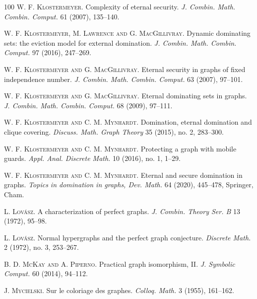 \documentclass[11pt]{article}
\begin{document}
\begin{thebibliography}{100}
	 \textsc{W. F. Klostermeyer}. Complexity of eternal security. \textit{J. Combin. Math. Combin. Comput.} 61 (2007), 135–140. 	
 	
 	 \textsc{W. F. Klostermeyer, M. Lawrence and G. MacGillivray}. Dynamic dominating sets: the eviction model for external domination. \textit{J. Combin. Math. Combin. Comput.} 97 (2016), 247–269. 
 	
 	 \textsc{W. F. Klostermeyer and G. MacGillivray}. Eternal security in graphs of fixed independence number. \textit{J. Combin. Math. Combin. Comput.} 63 (2007), 97–101. 
 	
 	 \textsc{W. F. Klostermeyer and G. MacGillivray}. Eternal dominating sets in graphs. \textit{J. Combin. Math. Combin. Comput.} 68 (2009), 97–111. 
 	
 	 \textsc{W. F. Klostermeyer and C. M. Mynhardt}. Domination, eternal domination and clique covering. \textit{Discuss. Math. Graph Theory} 35 (2015), no. 2, 283–300. 
 	
 	 \textsc{W. F. Klostermeyer and C. M. Mynhardt}. Protecting a graph with mobile guards. \textit{Appl. Anal. Discrete Math.} 10 (2016), no. 1, 1–29. 
 	
	 \textsc{W. F. Klostermeyer and C. M. Mynhardt}. Eternal and secure domination in graphs. \textit{Topics in domination in graphs, Dev. Math.} 64 (2020), 445–478, Springer, Cham.
		
	 \textsc{L. Lov{\'a}sz}. A characterization of perfect graphs. \textit{J. Combin. Theory Ser. B} 13 (1972), 95–98. 
 	
	 \textsc{L. Lov{\'a}sz}. Normal hypergraphs and the perfect graph conjecture. \textit{Discrete Math.} 2 (1972), no. 3, 253–267.  	
	
	 \textsc{B. D. McKay and A. Piperno}. Practical graph isomorphism, II. \textit{J. Symbolic Comput.} 60 (2014), 94–112.
	
	 \textsc{J. Mycielski}. Sur le coloriage des graphes. \textit{Colloq. Math.} 3 (1955), 161–162.  
 	
	\end{thebibliography}
	
	
\end{document}
